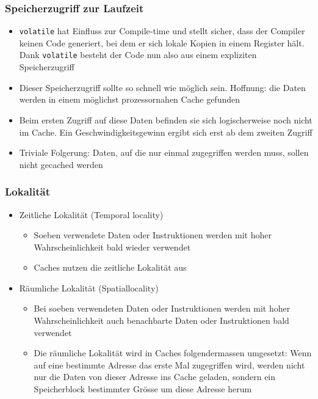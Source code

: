 \subsubsection{Speicherzugriff zur Laufzeit}
\begin{itemize}
	\item \lstinline{volatile} hat Einfluss zur Compile-time und stellt sicher, dass der Compiler keinen Code generiert, bei dem er sich lokale Kopien in einem Register hält. Dank \lstinline{volatile} besteht der Code nun also aus einem expliziten Speicherzugriff  
	\item Dieser Speicherzugriff sollte so schnell wie möglich sein. Hoffnung: die Daten werden in einem möglichst prozessornahen Cache gefunden  
	\item Beim ersten Zugriff auf diese Daten befinden sie sich logischerweise noch nicht im Cache. Ein Geschwindigkeitsgewinn ergibt sich erst ab dem zweiten Zugriff
	\item Triviale Folgerung: Daten, auf die nur einmal zugegriffen werden muss, sollen nicht gecached werden
\end{itemize}

\subsubsection{Lokalität}
\begin{minipage}[t]{6cm}
	\begin{itemize}
		\item Zeitliche Lokalität (Temporal locality) 
		\begin{itemize}
			\item Soeben verwendete Daten oder Instruktionen werden mit hoher Wahrscheinlichkeit bald wieder verwendet 
			\item Caches nutzen die zeitliche Lokalität aus
		\end{itemize}
	\end{itemize}
\end{minipage}
\begin{minipage}[t]{13cm}
	\begin{itemize}
		\item Räumliche Lokalität (Spatiallocality) 
		\begin{itemize}
			\item Bei soeben verwendeten Daten oder Instruktionen werden mit hoher Wahrscheinlichkeit auch benachbarte Daten oder Instruktionen bald verwendet 
			\item Die räumliche Lokalität wird in Caches folgendermassen umgesetzt: Wenn auf eine bestimmte Adresse das erste Mal zugegriffen wird, werden nicht nur die Daten von dieser Adresse ins Cache geladen, sondern ein Speicherblock bestimmter Grösse um diese Adresse herum
		\end{itemize}
	\end{itemize}
\end{minipage}

